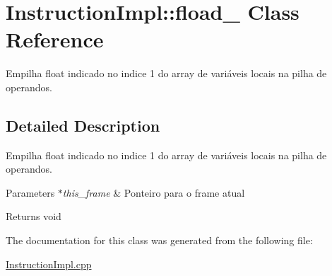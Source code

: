 \hypertarget{class_instruction_impl_1_1fload__1}{}\section{Instruction\+Impl\+:\+:fload\+\_ Class Reference}
\label{class_instruction_impl_1_1fload__1}


Empilha float indicado no indice 1 do array de variáveis locais na pilha de operandos.  




\subsection{Detailed Description}
Empilha float indicado no indice 1 do array de variáveis locais na pilha de operandos. 


\begin{DoxyParams}{Parameters}
{\em $\ast$this\+\_\+frame} & Ponteiro para o frame atual \\
\hline
\end{DoxyParams}
\begin{DoxyReturn}{Returns}
void 
\end{DoxyReturn}


The documentation for this class was generated from the following file\+:\begin{DoxyCompactItemize}
\item 
\hyperlink{_instruction_impl_8cpp}{Instruction\+Impl.\+cpp}\end{DoxyCompactItemize}
